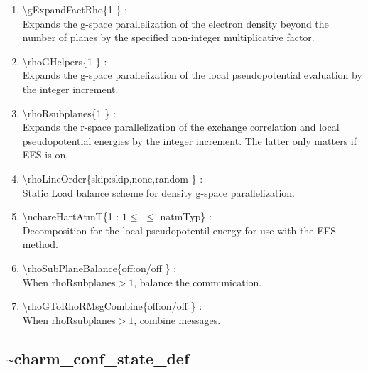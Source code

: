 \documentclass[12pt,titlepage]{article}
\begin{document}
\begin{enumerate}
  \vspace{0.15in} 
  \item \textbackslash gExpandFactRho\{1 \} : \\    
  Expands the g-space parallelization of the electron density beyond
  the number of planes by the specified non-integer multiplicative factor. 
  \vspace{0.15in} 
  \item \textbackslash rhoGHelpers\{1 \} : \\    
  Expands the g-space parallelization of the local pseudopotential
  evaluation by the integer increment.
  \vspace{0.15in} 
  \item \textbackslash rhoRsubplanes\{1 \} : \\    
  Expands the r-space parallelization of the exchange correlation and 
  local pseudopotential energies by the integer increment. 
  The latter only matters if EES is on.
  \vspace{0.15in} 
  \item \textbackslash rhoLineOrder\{skip:skip,none,random \} : \\    
  Static Load balance scheme for density g-space parallelization.
  \vspace{0.15in} 
  \item \textbackslash nchareHartAtmT\{1 : $1 \leq$ $\leq$ natmTyp\} : \\ 
  Decomposition for the local pseudopotentil energy for use with the 
  EES method.
  \vspace{0.15in} 
  \item \textbackslash rhoSubPlaneBalance\{off:on/off \} : \\    
  When rhoRsubplanes$>1$, balance the communication.
  \vspace{0.15in} 
  \item \textbackslash rhoGToRhoRMsgCombine\{off:on/off \} : \\    
  When rhoRsubplanes$>1$, combine messages.
\end{enumerate}

\newpage
\subsection*{\bf \~{ }charm\_conf\_state\_def}
\end{document}

